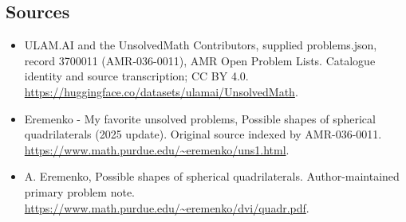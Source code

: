 \documentclass[11pt,a4paper]{article}
\begin{document}
\subsection{Sources}
\begin{itemize}
\item[S1] ULAM.AI and the UnsolvedMath Contributors, supplied problems.json, record 3700011 (AMR-036-0011), AMR Open Problem Lists. Catalogue identity and source transcription; CC BY 4.0.
\url{https://huggingface.co/datasets/ulamai/UnsolvedMath}.
\item[S2] Eremenko - My favorite unsolved problems, Possible shapes of spherical quadrilaterals (2025 update). Original source indexed by AMR-036-0011.
\url{https://www.math.purdue.edu/~eremenko/uns1.html}.
\item[S3] A. Eremenko, Possible shapes of spherical quadrilaterals. Author-maintained primary problem note.
\url{https://www.math.purdue.edu/~eremenko/dvi/quadr.pdf}.
\end{itemize}
\end{document}
